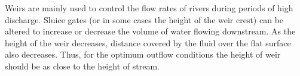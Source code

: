 \documentclass[11pt]{article}
\makeatletter
\newcommand{\boxspacing}{\kern\kvtcb@left@rule\kern\kvtcb@boxsep}
\newcommand{\prompt}[4]{
        {\ttfamily\llap{{\color{#2}[#3]:\hspace{3pt}#4}}\vspace{-\baselineskip}}
    }
\makeatother
\begin{document}
Weirs are mainly used to control the flow rates of rivers during periods
of high discharge. Sluice gates (or in some cases the height of the weir
crest) can be altered to increase or decrease the volume of water
flowing downstream. As the height of the weir decreases, distance
covered by the fluid over the flat surface also decreases. Thus, for the
optimum outflow conditions the height of weir should be as close to the
height of stream.

    \begin{tcolorbox}[breakable, size=fbox, boxrule=1pt, pad at break*=1mm,colback=cellbackground, colframe=cellborder]
\prompt{In}{incolor}{ }{\boxspacing}
\begin{Verbatim}[commandchars=\\\{\}]

\end{Verbatim}
\end{tcolorbox}


    
    
    
\end{document}
